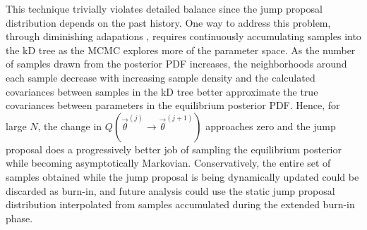 \documentclass{rsos}
\newcommand{\vtheta}{\vec{\theta}}
\newcommand{\Nbox}{N_\mathrm{box}}
\newcommand{\Vbox}{V_\mathrm{box}}
\newcommand{\ee}{\end{equation}}
\newcommand{\bel}[1]{\begin{equation}\label{#1}}
\newcommand{\ilya}[1]{{\color{red} \bf #1}}
\begin{document}
%
%



This technique trivially violates detailed balance since the jump proposal distribution depends on the past history. One way to address this problem, through diminishing adapations \cite{Brooks:2011}, requires continuously accumulating samples into the kD tree as the MCMC explores more
of the parameter space. As the number of samples drawn from the posterior PDF increases, the neighborhoods around each sample decrease with increasing sample density and the calculated covariances between samples in the kD tree better approximate the true covariances between parameters in the equilibrium posterior PDF.  Hence, for large $N$, the change in $Q(\vtheta^{(j)} \rightarrow \vtheta^{(j+1)})$ approaches zero and the jump proposal does a progressively better job of sampling the equilibrium posterior while becoming asymptotically Markovian.  Conservatively, the entire set of samples obtained while the jump proposal is being dynamically updated could be discarded as burn-in, and future analysis could use the static jump proposal distribution interpolated from samples accumulated during the extended burn-in phase. 
\end{document}
